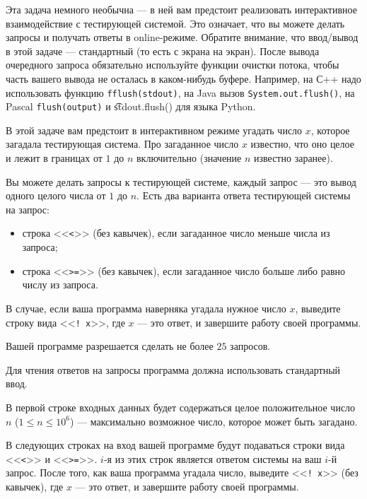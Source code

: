 Эта задача немного необычна --- в ней вам предстоит реализовать интерактивное взаимодействие с тестирующей системой. Это означает, что вы можете делать запросы и получать ответы в online-режиме. Обратите внимание, что ввод/вывод в этой задаче --- стандартный (то есть с экрана на экран). После вывода очередного запроса обязательно используйте функции очистки потока, чтобы часть вашего вывода не осталась в каком-нибудь буфере. Например, на С++ надо использовать функцию \texttt{fflush(stdout)}, на Java вызов \texttt{System.out.flush()}, на Pascal \texttt{flush(output)} и \t{stdout.flush()} для языка Python.

В этой задаче вам предстоит в интерактивном режиме угадать число $x$, которое загадала тестирующая система. Про загаданное число $x$ известно, что оно целое и лежит в границах от $1$ до $n$ включительно (значение $n$ известно заранее).

Вы можете делать запросы к тестирующей системе, каждый запрос --- это вывод одного целого числа от $1$ до $n$. Есть два варианта ответа тестирующей системы на запрос:

\begin{itemize}
\item строка <<\texttt{<}>> (без кавычек), если загаданное число меньше числа из запроса;
\item строка <<\texttt{>=}>> (без кавычек), если загаданное число больше либо равно числу из запроса.
\end{itemize}

В случае, если ваша программа наверняка угадала нужное число $x$, выведите строку вида <<\texttt{! x}>>, где $x$ --- это ответ, и завершите работу своей программы.

Вашей программе разрешается сделать не более $25$ запросов.

\InputFile

Для чтения ответов на запросы программа должна использовать стандартный ввод.

В первой строке входных данных будет содержаться целое положительное число $n$ ($1 \le n \le 10^6$) --- максимально возможное число, которое может быть загадано.

В следующих строках на вход вашей программе будут подаваться строки вида <<\texttt{<}>> и <<\texttt{>=}>>. $i$-я из этих строк является ответом системы на ваш $i$-й запрос. После того, как ваша программа угадала число, выведите <<\texttt{! x}>> (без кавычек), где $x$ --- это ответ, и завершите работу своей программы.

